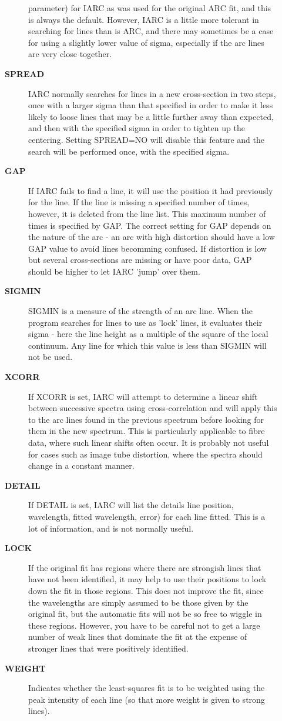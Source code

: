 \begin{description}
\begin{description}
 parameter) for IARC as was used for the original ARC fit,
 and this is always the default.  However, IARC is a
 little more tolerant in searching for lines than is ARC,
 and there may sometimes be a case for using a slightly
 lower value of sigma, especially if the arc lines are
 very close together.
\item [{\bf SPREAD}]
 IARC normally searches for lines in a new cross-section
 in two steps, once with a larger sigma than that specified
 in order to make it less likely to loose lines that may
 be a little further away than expected, and then with
 the specified sigma in order to tighten up the centering.
 Setting SPREAD=NO will disable this feature and the search
 will be performed once, with the specified sigma.
\item [{\bf GAP}]
 If IARC fails to find a line, it will use the position
 it had previously for the line.  If the line is missing
 a specified number of times, however, it is deleted from
 the line list.  This maximum number of times is specified
 by GAP.  The correct setting for GAP depends on the nature
 of the arc - an arc with high distortion should have a low
 GAP value to avoid lines becomming confused.  If distortion
 is low but several cross-sections are missing or have poor
 data, GAP should be higher to let IARC 'jump' over them.
\item [{\bf SIGMIN}]
 SIGMIN is a measure of the strength of an arc line.  When
 the program searches for lines to use as 'lock' lines, it
 evaluates their sigma - here the line height as a multiple
 of the square of the local continuum.  Any line for which
 this value is less than SIGMIN will not be used.
\item [{\bf XCORR}]
 If XCORR is set, IARC will attempt to determine a linear
 shift between successive spectra using cross-correlation
 and will apply this to the arc lines found in the previous
 spectrum before looking for them in the new spectrum. This
 is particularly applicable to fibre data, where such linear
 shifts often occur.  It is probably not useful for cases
 such as image tube distortion, where the spectra should
 change in a constant manner.
\item [{\bf DETAIL}]
 If DETAIL is set, IARC will list the details line position,
 wavelength, fitted wavelength, error) for each line fitted.
 This is a lot of information, and is not normally useful.
\item [{\bf LOCK}]
 If the original fit has regions where there are strongish
 lines that have not been identified, it may help to use
 their positions to lock down the fit in those regions.  This
 does not improve the fit, since the wavelengths are simply
 assumed to be those given by the original fit, but the
 automatic fits will not be so free to wiggle in these regions.
 However, you have to be careful not to get a large number of
 weak lines that dominate the fit at the expense of stronger
 lines that were positively identified.
\item [{\bf WEIGHT}]
 Indicates whether the least-squares fit is to be weighted using
 the peak intensity of each line (so that more weight is given to
 strong lines).
\end{description}


\end{description}
